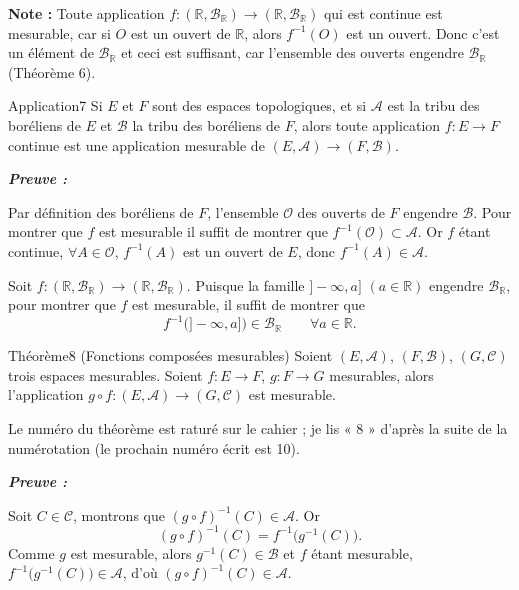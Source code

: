 \documentclass[11pt,a4paper]{article}
\newcommand{\R}{\mathbb{R}}
\newcommand{\A}{\mathscr{A}}
\newcommand{\B}{\mathscr{B}}
\newcommand{\C}{\mathscr{C}}
\newcommand{\Oo}{\mathscr{O}}
\newenvironment{preuve}{\par\textit{\textbf{Preuve :}}\par\nopagebreak[4]}{\par}
\begin{document}
\begin{tcolorbox}[colback=gray!8,colframe=gray!60,boxrule=0pt,leftrule=2pt,arc=0pt,left=6pt,top=2pt,bottom=2pt]
\textbf{Note :} Toute application $f:(\R,\B_{\R})\to(\R,\B_{\R})$ qui est continue est mesurable, car si $O$ est un ouvert de $\R$,
alors $f^{-1}(O)$ est un ouvert. Donc c'est un élément de $\B_{\R}$ et ceci est suffisant, car l'ensemble des ouverts
engendre $\B_{\R}$ (Théorème 6).
\end{tcolorbox}

\begin{enonce}{Application}{7}
Si $E$ et $F$ sont des espaces topologiques, et si $\A$ est la tribu des boréliens de $E$ et $\B$ la tribu des
boréliens de $F$, alors toute application $f:E\to F$ continue est une application mesurable de $(E,\A)\to(F,\B)$.
\end{enonce}

\begin{preuve}\end{preuve}
Par définition des boréliens de $F$, l'ensemble $\Oo$ des ouverts de $F$ engendre $\B$.
Pour montrer que $f$ est mesurable il suffit de montrer que $f^{-1}(\Oo)\subset\A$.
Or $f$ étant continue, $\forall A\in\Oo$, $f^{-1}(A)$ est un ouvert de $E$, donc $f^{-1}(A)\in\A$.

Soit $f:(\R,\B_{\R})\to(\R,\B_{\R})$. Puisque la famille $]-\infty,a]$ $(a\in\R)$ engendre $\B_{\R}$,
pour montrer que $f$ est mesurable, il suffit de montrer que
\[
  f^{-1}\bigl(]-\infty,a]\bigr)\in\B_{\R}\qquad\forall a\in\R .
\]

\begin{enonce}{Théorème}{8 \textnormal{(Fonctions composées mesurables)}}
Soient $(E,\A)$, $(F,\B)$, $(G,\C)$ trois espaces mesurables. Soient $f:E\to F$, $g:F\to G$ mesurables, alors
l'application $g\circ f:(E,\A)\to(G,\C)$ est mesurable.
\end{enonce}

\begin{note}
Le numéro du théorème est raturé sur le cahier ; je lis « 8 » d'après la suite de la numérotation (le prochain
numéro écrit est 10).
\end{note}

\begin{preuve}\end{preuve}
Soit $C\in\C$, montrons que $(g\circ f)^{-1}(C)\in\A$. Or
\[
  (g\circ f)^{-1}(C)=f^{-1}\bigl(g^{-1}(C)\bigr).
\]
Comme $g$ est mesurable, alors $g^{-1}(C)\in\B$ et $f$ étant mesurable, $f^{-1}\bigl(g^{-1}(C)\bigr)\in\A$,
d'où $(g\circ f)^{-1}(C)\in\A$.
\end{document}
